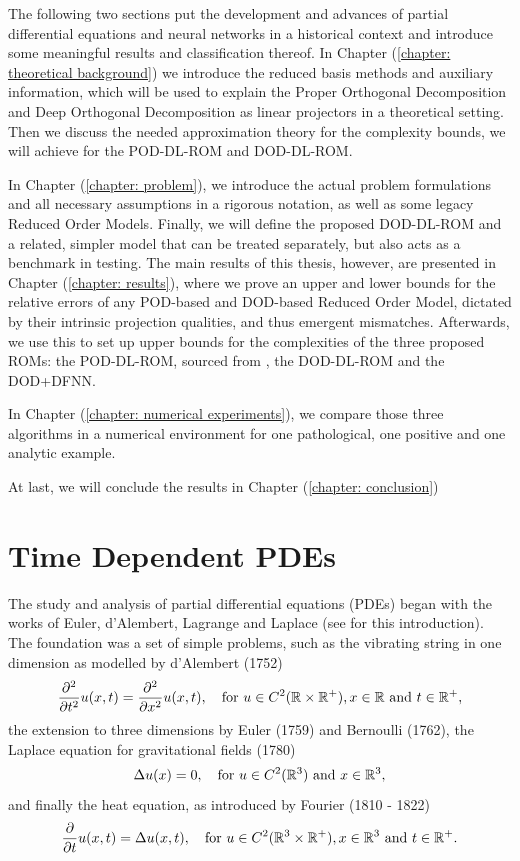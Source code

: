 The following two sections put the development
and advances of partial differential equations and neural networks in a historical context and introduce some meaningful
results and classification thereof. 
In Chapter (\ref{chapter: theoretical background}) we introduce
the reduced basis methods and auxiliary information, which will be used to explain the Proper Orthogonal
Decomposition and Deep Orthogonal Decomposition as linear projectors in a theoretical setting. Then we
discuss the needed approximation theory for the complexity bounds, we will achieve for the POD-DL-ROM and DOD-DL-ROM.

In Chapter (\ref{chapter: problem}), we introduce the actual problem formulations and all necessary assumptions in
a rigorous notation, as well as some legacy Reduced Order Models. Finally, we will define the proposed DOD-DL-ROM and
a related, simpler model that can be treated separately, but also acts as a benchmark in testing.
The main results of this thesis, however, are presented in Chapter (\ref{chapter: results}), 
where we prove an upper and lower bounds for the relative errors of any POD-based and DOD-based Reduced Order Model,
dictated by their intrinsic projection qualities, and thus emergent mismatches. Afterwards, 
we use this to set up upper bounds for the complexities of the three proposed ROMs: the POD-DL-ROM,
sourced from \cite{brivio2023}, the DOD-DL-ROM and the DOD+DFNN.

In Chapter (\ref{chapter: numerical experiments}), we compare those three algorithms
in a numerical environment for one pathological, one positive and one analytic example.

At last, we will conclude the results in Chapter (\ref{chapter: conclusion})






\section{Time Dependent PDEs}


The study and analysis of partial differential equations (PDEs) began with the works of Euler, d'Alembert, Lagrange
and Laplace (see \cite{brezis1998} for this introduction). The foundation was a set of simple problems, such as
the vibrating string in one dimension as modelled
by d'Alembert (1752)
\begin{equation*}
    \frac{\partial^2}{\partial t^2} u(x, t) = \frac{\partial^2}{\partial x^2}u(x, t), \quad \text{for }u \in C^2(\mathbb{R} \times \mathbb{R}^+), x \in \mathbb{R} \text{ and }
    t \in \mathbb{R}^+,
\end{equation*} 
the extension to three dimensions by Euler (1759) and Bernoulli (1762),
the Laplace equation for gravitational fields (1780) 
\begin{equation*}
    \Delta u(x) = 0, \quad \text{for }u \in C^2(\mathbb{R}^3) \text{ and } x \in \mathbb{R}^3,
\end{equation*} 
and finally the heat equation, as introduced
by Fourier (1810 - 1822)
\begin{equation*}
    \frac{\partial}{\partial t} u(x, t) = \Delta u(x, t), \quad \text{for }u \in C^2(\mathbb{R}^3 \times \mathbb{R}^+), x \in \mathbb{R}^3
    \text{ and }t \in \mathbb{R}^+.
\end{equation*}

